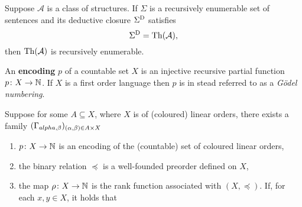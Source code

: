 	\begin{prp}\label{prp:sdth}
		Suppose $\mathcal{A}$ is a class of structures.  If $\Sigma$ is a recursively enumerable set of sentences and its deductive closure ${\Sigma}^\mathrm{D}$ satisfies
		\begin{equation}
			{\Sigma}^\mathrm{D}=\operatorname{Th}(\mathcal{A}),
		\end{equation}
		then $\operatorname{Th}(\mathcal{A})$ is recursively enumerable.
	\end{prp}

	\begin{dfn}[Encoding]
		An \textbf{encoding} $p$ of a countable set $X$ is an injective recursive partial function $p\colon X\to\mathbb{N}$.  If $X$ is a first order language then $p$ is in stead referred to as a \textit{G\"odel numbering}.
	\end{dfn}

	\begin{dfn}[Frameworks]
		Suppose for some $A\subseteq X$, where $X$ is of (coloured) linear orders, there exists a family $(\Gamma_{alpha,\beta})_{(\alpha,\beta)\in A\times X}$
		\begin{enumerate}
			\item	$p\colon X\to\mathbb{N}$ is an encoding of the (countable) set of coloured linear orders,
			\item 	the binary relation $\preceq$ is a well-founded preorder defined on $X$,
			\item	the map $\rho\colon X\to\mathbb{N}$ is the rank function associated with $(X,\preceq)$.  If, for each $x,y\in X$, it holds that
		\end{enumerate}
	\end{dfn}

